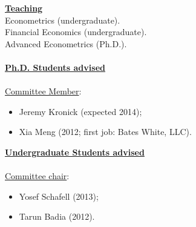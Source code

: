 \documentclass[12pt]{article}
\begin{document}
\underline{\textbf{Teaching}}\\
Econometrics (undergraduate).\\
Financial Economics (undergraduate). \\
Advanced Econometrics (Ph.D.). \\ \\
\underline{\textbf{Ph.D. Students advised}} \\ \\
\underline{Committee Member}: 
\begin{itemize}
	\item Jeremy Kronick (expected 2014);
	\item Xia Meng (2012; first job: Bates White, LLC). 
\end{itemize}
\clearpage
\underline{\textbf{Undergraduate Students advised}} \\ \\
\underline{Committee chair}: 
\begin{itemize}
	\item Yosef Schafell (2013);
	\item Tarun Badia (2012). 
\end{itemize}
\end{document}
